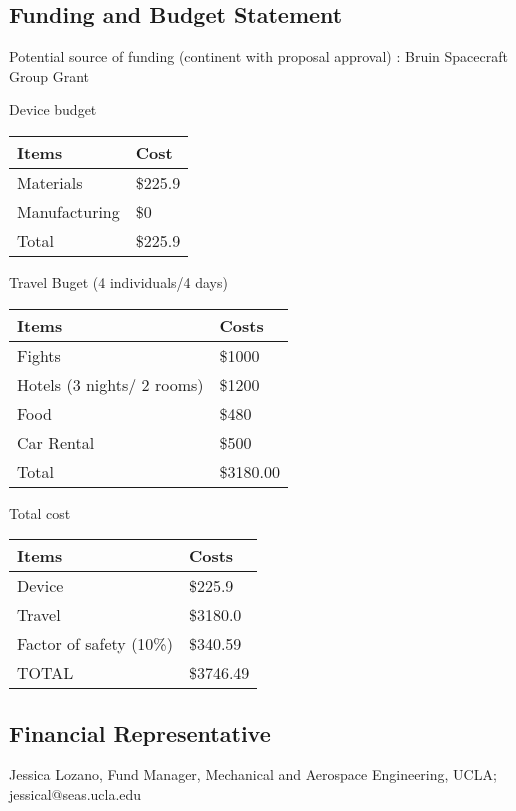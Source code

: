 \documentclass{article}
\begin{document}
\subsection{Funding and Budget Statement}
\noindent
Potential source of funding (continent with proposal approval) : Bruin Spacecraft Group Grant


\begin{center}
Device budget
\break
\break
    \begin{tabulary}{\linewidth}{|L|L|}
    \hline
    Items       &   Cost    \\
    \hline
    Materials   &   \$225.9 \\
    \hline
    Manufacturing   &   \$0 \\
    \hline
    Total       &   \$225.9   \\
    \hline
    \end{tabulary}
\end{center}

\begin{center}
Travel Buget (4 individuals/4 days)
\break
\break
    \begin{tabulary}{\linewidth}{|L|L|}
\hline
Items & Costs \\
 \hline
    Fights      &   \$1000  \\
    \hline
    Hotels (3 nights/ 2 rooms)  &   \$1200  \\
    \hline
    Food        &   \$480   \\
    \hline
    Car Rental  &   \$500   \\
    \hline
    Total       &   \$3180.00   \\
    \hline
    \end{tabulary}
    \end{center}
   
    
    \begin{center}
    Total cost
    \break 
    \break
    \begin{tabulary}{\linewidth}{|L|L|}
    \hline
    Items & Costs \\
    \hline
    Device & \$225.9\\
    \hline
    Travel & \$3180.0\\
    \hline
    Factor of safety (10\%) & \$340.59\\
    \hline
    TOTAL & \$3746.49\\
    \hline
    \end{tabulary}
    \end{center}
    \break

    
\subsection{Financial Representative}
\noindent
Jessica Lozano, Fund Manager, Mechanical and Aerospace Engineering, UCLA; \\
jessical@seas.ucla.edu




\end{document}
